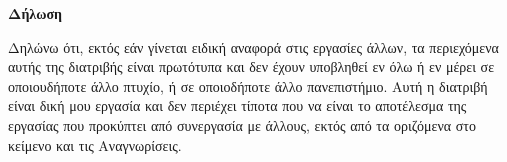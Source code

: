 \begin{center}
    \Large\textbf{Δήλωση}
\end{center}

\hspace{2cm}

Δηλώνω ότι, εκτός εάν γίνεται ειδική αναφορά στις εργασίες άλλων,
τα περιεχόμενα αυτής της διατριβής είναι πρωτότυπα και δεν έχουν
υποβληθεί εν όλω ή εν μέρει σε οποιουδήποτε άλλο πτυχίο, ή σε οποιοδήποτε
άλλο πανεπιστήμιο. Αυτή η διατριβή είναι δική μου εργασία και δεν περιέχει
τίποτα που να είναι το αποτέλεσμα της εργασίας που προκύπτει από συνεργασία με
άλλους, εκτός από τα οριζόμενα στο κείμενο και τις Αναγνωρίσεις.\\


